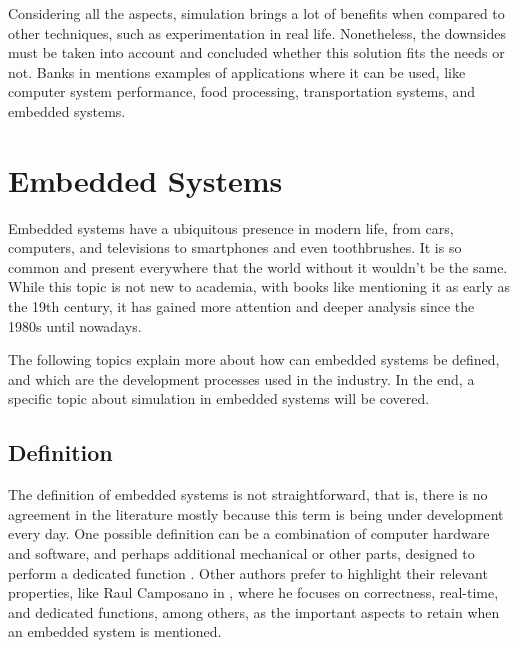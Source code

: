 Considering all the aspects, simulation brings a lot of benefits when compared to other techniques, such as experimentation in real life. Nonetheless, the downsides must be taken into account and concluded whether this solution fits the needs or not. Banks in \cite{BanksDiscreteSimulation} mentions examples of applications where it can be used, like computer system performance, food processing, transportation systems, and embedded systems.


\section{Embedded Systems}

Embedded systems have a ubiquitous presence in modern life, from cars, computers, and televisions to smartphones and even toothbrushes. It is so common and present everywhere that the world without it wouldn't be the same. While this topic is not new to academia, with books like \cite{banks1999introduction} mentioning it as early as the 19th century, it has gained more attention and deeper analysis since the 1980s until nowadays. 

The following topics explain more about how can embedded systems be defined, and which are the development processes used in the industry. In the end, a specific topic about simulation in embedded systems will be covered.

\subsection{Definition}

The definition of embedded systems is not straightforward, that is, there is no agreement in the literature mostly because this term is being under development every day. One possible definition can be a combination of computer hardware and software, and perhaps additional mechanical or other parts, designed to perform a dedicated function \cite{EmbeddedSystemsGlossary}. Other authors prefer to highlight their relevant properties, like Raul Camposano in \cite{camposano1996embedded}, where he focuses on correctness, real-time, and dedicated functions, among others, as the important aspects to retain when an embedded system is mentioned. 

